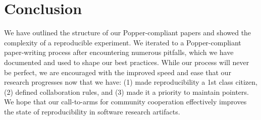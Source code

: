\section{Conclusion}

We have outlined the structure of our Popper-compliant papers and showed the
complexity of a reproducible experiment. We iterated to a Popper-compliant
paper-writing process after encountering numerous pitfalls, which we have
documented and used to shape our best practices. While our process will never
be perfect, we are encouraged with the improved speed and ease that our research
progresses now that we have: (1) made reproducibility a 1st class citizen, (2)
defined collaboration rules, and (3) made it a priority to maintain pointers.
We hope that our call-to-arms for community cooperation effectively improves
the state of reproducibility in software research artifacts.

